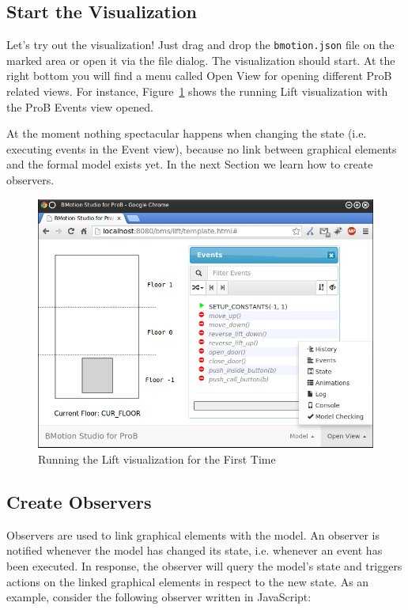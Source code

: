 \subsection{Start the Visualization}

Let's try out the visualization!
Just drag and drop the \texttt{bmotion.json} file on the marked area or open it via the file dialog.
The visualization should start.
At the right bottom you will find a menu called \textsf{Open View} for opening different ProB related views.
For instance, Figure~\ref{fig_tut_03_running1} shows the running Lift visualization with the ProB Events view opened.

At the moment nothing spectacular happens when changing the state (i.e. executing events in the Event view), because no link between graphical elements and the formal model exists yet.
In the next Section we learn how to create observers.

\begin{figure}[!ht]
\begin{center}
	\includegraphics[width=12cm]{img/tutorial/tut_03.png}
	\caption{Running the Lift visualization for the First Time}
	\label{fig_tut_03_running1}
\end{center}
\end{figure}

\subsection{Create Observers}
\label{sec_creation_observers}

Observers are used to link graphical elements with the model. 
An observer is notified whenever the model has changed its state, i.e. whenever an event has been executed. 
In response, the observer will query the model's state and triggers actions on the linked graphical elements in respect to the new state.
As an example, consider the following observer written in JavaScript:

